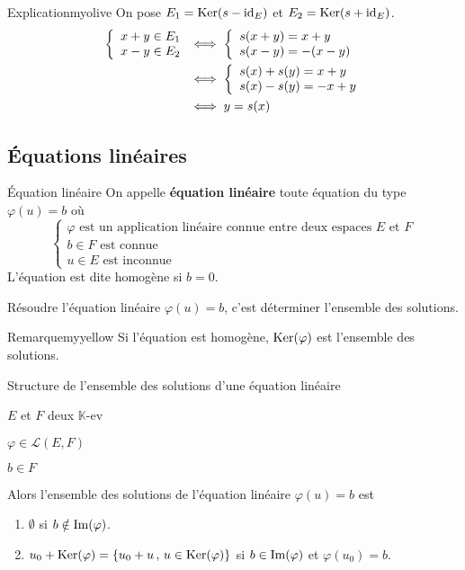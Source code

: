     \begin{demo}{Explication}{myolive}
        On pose $E_1 = \operatorname{Ker}(s -\operatorname{id}_E)$ et $E_2 = \operatorname{Ker}(s + \operatorname{id}_E)$.
        \begin{align*}
            \et{x+y \in E_1}{x-y \in E_2} & \iff \et{s(x+y) = x+y}{s(x-y) = -(x-y)} \\
            & \iff \et{s(x) + s(y) = x +y }{s(x)- s(y) = -x +y} \\
            & \iff y = s(x)
        \end{align*}
    \end{demo}

\subsection{Équations linéaires}

    \begin{defi}{Équation linéaire}{}
        On appelle \textbf{équation linéaire} toute équation du type $ \varphi (u) = b $ où 
        \[ \left\{ \begin{array}{l}
            \varphi \text{ est un application linéaire connue entre deux espaces } E \text{ et } F \\
            b \in F \text{ est connue} \\
            u \in E \text{ est inconnue}
        \end{array} \right. \]
        L’équation est dite homogène si $b= 0$.
    
        Résoudre l’équation linéaire $\varphi (u) = b$, c’est déterminer l’ensemble des solutions.
    \end{defi}
    
    \begin{omed}{Remarque}{myyellow}
        Si l’équation est homogène, $\operatorname{Ker}(\varphi)$ est l’ensemble des solutions.
    \end{omed}
    
    \begin{prop}{Structure de l’ensemble des solutions d’une équation linéaire}{}
        \begin{soient}
            \item $E$ et $F$ deux $\mathbb{K}$-ev
            \item $\varphi \in \mathcal{L}(E,F)$
            \item $b \in F$
        \end{soient}
        Alors l’ensemble des solutions de l’équation linéaire $ \varphi (u) = b $ est 
        \begin{enumerate}
            \item $\emptyset$ si $b \notin \operatorname{Im}(\varphi)$.
            \item $ u_0 + \operatorname{Ker}(\varphi) = \left\{ u_0 + u \, , \, u \in \operatorname{Ker}(\varphi) \right\}$ si $b \in \operatorname{Im}(\varphi)$ et $\varphi(u_0) = b$.
        \end{enumerate}
    \end{prop}

